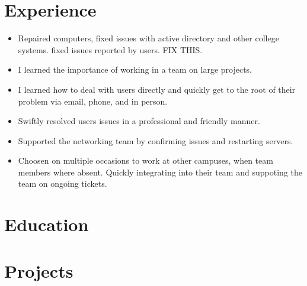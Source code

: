 \documentclass[a4paper]{cv}
\begin{document}
\begin{minipage}[t]{0.66\textwidth}
\section{Experience}
\begin{itemize}
    \item Repaired computers, fixed issues with active directory and other college systems. fixed issues reported by users. FIX THIS.
    \item I learned the importance of working in a team on large projects.
    \item I learned how to deal with users directly and quickly get to the root of their problem via email, phone, and in person.
    \item Swiftly resolved users issues in a professional and friendly manner.
    \item Supported the networking team by confirming issues and restarting servers.
    \item Choosen on multiple occasions to work at other campuses, when team members where absent. Quickly integrating into their team and suppoting the team on ongoing tickets.
\end{itemize}
\section{Education}
\sectionspace

\sectionspace

 
\section{Projects}

\end{minipage}
\end{document}
